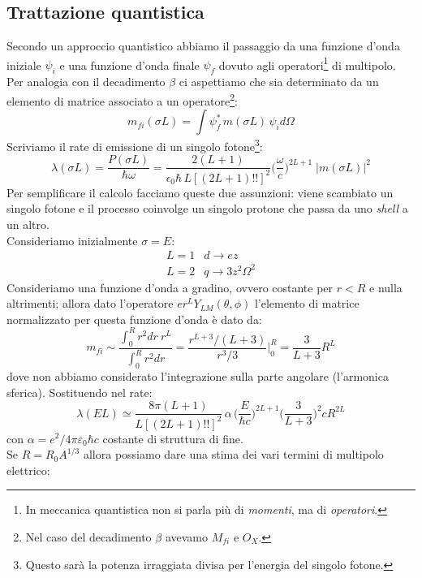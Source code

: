 \subsection{Trattazione quantistica}\label{sec-gamma-multipoli}
Secondo un approccio quantistico abbiamo il passaggio da una funzione d'onda iniziale $\psi_i$ e una funzione d'onda finale $\psi_f$ dovuto agli operatori\footnote{In meccanica quantistica non si parla più di \textit{momenti}, ma di \textit{operatori}.} di multipolo. Per analogia con il decadimento $\beta$ ci aspettiamo che sia determinato da un elemento di matrice associato a un operatore\footnote{Nel caso del decadimento $\beta$ avevamo $M_{fi}$ e $O_X$.}:
$$m_{fi}(\sigma L) = \int \psi_f^*\, m(\sigma L)\, \psi_i d\Omega$$
Scriviamo il rate di emissione di un singolo fotone\footnote{Questo sarà la potenza irraggiata divisa per l'energia del singolo fotone.}:
\begin{equation*}\label{0308_rate}
    \lambda (\sigma L) = \frac{P(\sigma L)}{\hbar \omega} = \frac{2(L+1)}{\epsilon_0\hbar\,L[(2L+1)!!]^2} \bigl ( \frac{\omega}{c}\bigr)^{2L+1} \; |m(\sigma L)|^2
\end{equation*}
Per semplificare il calcolo facciamo queste due assunzioni: viene scambiato un singolo fotone e il processo coinvolge un singolo protone che passa da uno \textit{shell} a un altro.\\ Consideriamo inizialmente $\sigma = E$:
\begin{displaymath}
\begin{array}{ll}
    L=1 & d\to ez \\
    L=2 & q\to 3z^2\Omega^2
\end{array}
\end{displaymath}
Consideriamo una funzione d'onda a gradino, ovvero costante per $r<R$ e nulla altrimenti; allora dato l'operatore $e r^L Y_{LM}(\theta, \phi)$ l'elemento di matrice normalizzato per questa funzione d'onda è dato da:
$$m_{fi} \sim \frac{\int_0^R r^2 dr\: r^L}{\int_0^R r^2 dr} = \frac{r^{L+3}/ (L+3)}{r^3 / 3}\Biggr |_0^R = \frac{3}{L+3}R^L$$
dove non abbiamo considerato l'integrazione sulla parte angolare (l'armonica sferica). Sostituendo nel rate:
$$\lambda(EL)\simeq \frac{8\pi(L+1)}{L[(2L+1)!!]^2}\,\alpha\,\bigl(\frac{E}{\hbar c} \bigr)^{2L+1}\bigl(\frac{3}{L+3} \bigr)^2cR^{2L}$$
con $\alpha = e^2/4\pi\varepsilon_0\hbar c$ costante di struttura di fine.\\
Se $R=R_0A^{1/3}$ allora possiamo dare una stima dei vari termini di multipolo elettrico:
